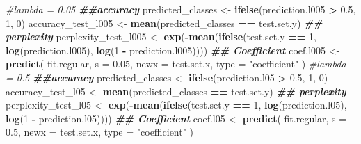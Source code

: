 \documentclass[
]{article}
\newenvironment{Shaded}{\begin{snugshade}}{\end{snugshade}}
\newcommand{\AttributeTok}[1]{\textcolor[rgb]{0.13,0.29,0.53}{#1}}
\newcommand{\CommentTok}[1]{\textcolor[rgb]{0.56,0.35,0.01}{\textit{#1}}}
\newcommand{\DecValTok}[1]{\textcolor[rgb]{0.00,0.00,0.81}{#1}}
\newcommand{\DocumentationTok}[1]{\textcolor[rgb]{0.56,0.35,0.01}{\textbf{\textit{#1}}}}
\newcommand{\FloatTok}[1]{\textcolor[rgb]{0.00,0.00,0.81}{#1}}
\newcommand{\FunctionTok}[1]{\textcolor[rgb]{0.13,0.29,0.53}{\textbf{#1}}}
\newcommand{\NormalTok}[1]{#1}
\newcommand{\OtherTok}[1]{\textcolor[rgb]{0.56,0.35,0.01}{#1}}
\newcommand{\SpecialCharTok}[1]{\textcolor[rgb]{0.81,0.36,0.00}{\textbf{#1}}}
\newcommand{\StringTok}[1]{\textcolor[rgb]{0.31,0.60,0.02}{#1}}
\begin{document}
\begin{Shaded}
\begin{Highlighting}[]
\CommentTok{\#lambda = 0.05}
\DocumentationTok{\#\#accuracy}
\NormalTok{predicted\_classes }\OtherTok{\textless{}{-}} \FunctionTok{ifelse}\NormalTok{(prediction.l005 }\SpecialCharTok{\textgreater{}} \FloatTok{0.5}\NormalTok{, }\DecValTok{1}\NormalTok{, }\DecValTok{0}\NormalTok{)}
\NormalTok{accuracy\_test\_l005 }\OtherTok{\textless{}{-}} \FunctionTok{mean}\NormalTok{(predicted\_classes }\SpecialCharTok{==}\NormalTok{ test.set.y)}
\DocumentationTok{\#\# perplexity }
\NormalTok{perplexity\_test\_l005 }\OtherTok{\textless{}{-}} 
  \FunctionTok{exp}\NormalTok{(}\SpecialCharTok{{-}}\FunctionTok{mean}\NormalTok{(}\FunctionTok{ifelse}\NormalTok{(test.set.y }\SpecialCharTok{==} \DecValTok{1}\NormalTok{, }\FunctionTok{log}\NormalTok{(prediction.l005), }\FunctionTok{log}\NormalTok{(}\DecValTok{1} \SpecialCharTok{{-}}\NormalTok{ prediction.l005))))}
\DocumentationTok{\#\# Coefficient}
\NormalTok{coef.l005 }\OtherTok{\textless{}{-}}  
  \FunctionTok{predict}\NormalTok{(}
\NormalTok{    fit.regular, }
    \AttributeTok{s =} \FloatTok{0.05}\NormalTok{, }
    \AttributeTok{newx =}\NormalTok{ test.set.x,}
    \AttributeTok{type =} \StringTok{"coefficient"}
\NormalTok{    )}
\CommentTok{\#lambda = 0.5}
\DocumentationTok{\#\#accuracy}
\NormalTok{predicted\_classes }\OtherTok{\textless{}{-}} \FunctionTok{ifelse}\NormalTok{(prediction.l05 }\SpecialCharTok{\textgreater{}} \FloatTok{0.5}\NormalTok{, }\DecValTok{1}\NormalTok{, }\DecValTok{0}\NormalTok{)}
\NormalTok{accuracy\_test\_l05 }\OtherTok{\textless{}{-}} \FunctionTok{mean}\NormalTok{(predicted\_classes }\SpecialCharTok{==}\NormalTok{ test.set.y)}
\DocumentationTok{\#\# perplexity }
\NormalTok{perplexity\_test\_l05 }\OtherTok{\textless{}{-}} 
  \FunctionTok{exp}\NormalTok{(}\SpecialCharTok{{-}}\FunctionTok{mean}\NormalTok{(}\FunctionTok{ifelse}\NormalTok{(test.set.y }\SpecialCharTok{==} \DecValTok{1}\NormalTok{, }\FunctionTok{log}\NormalTok{(prediction.l05), }\FunctionTok{log}\NormalTok{(}\DecValTok{1} \SpecialCharTok{{-}}\NormalTok{ prediction.l05))))}
\DocumentationTok{\#\# Coefficient}
\NormalTok{coef.l05 }\OtherTok{\textless{}{-}}  
  \FunctionTok{predict}\NormalTok{(}
\NormalTok{    fit.regular, }
    \AttributeTok{s =} \FloatTok{0.5}\NormalTok{, }
    \AttributeTok{newx =}\NormalTok{ test.set.x,}
    \AttributeTok{type =} \StringTok{"coefficient"}
\NormalTok{    )}


\end{Highlighting}
\end{Shaded}
\end{document}
